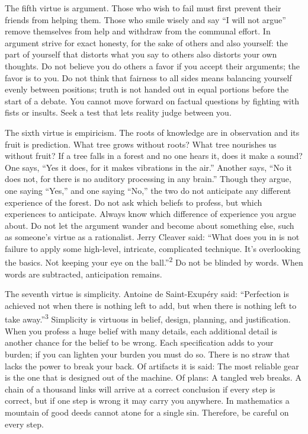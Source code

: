 {
 The fifth virtue is argument. Those who wish to fail must first
prevent their friends from helping them. Those who smile wisely and say
``I will not argue'' remove
themselves from help and withdraw from the communal effort. In argument
strive for exact honesty, for the sake of others and also yourself: the
part of yourself that distorts what you say to others also distorts
your own thoughts. Do not believe you do others a favor if you accept
their arguments; the favor is to you. Do not think that fairness to all
sides means balancing yourself evenly between positions; truth is not
handed out in equal portions before the start of a debate. You cannot
move forward on factual questions by fighting with fists or insults.
Seek a test that lets reality judge between you.}

{
 The sixth virtue is empiricism. The roots of knowledge are in
observation and its fruit is prediction. What tree grows without roots?
What tree nourishes us without fruit? If a tree falls in a forest and
no one hears it, does it make a sound? One says, ``Yes
it does, for it makes vibrations in the air.''
Another says, ``No it does not, for there is no
auditory processing in any brain.'' Though they
argue, one saying ``Yes,'' and one
saying ``No,'' the two do not
anticipate any different experience of the forest. Do not ask which
beliefs to profess, but which experiences to anticipate. Always know
which difference of experience you argue about. Do not let the argument
wander and become about something else, such as
someone's virtue as a rationalist. Jerry Cleaver said:
``What does you in is not failure to apply some
high-level, intricate, complicated technique. It's
overlooking the basics. Not keeping your eye on the
ball.''\textsuperscript{2} Do not be blinded by
words. When words are subtracted, anticipation remains.}

{
 The seventh virtue is simplicity. Antoine de Saint-Exupéry said:
``Perfection is achieved not when there is nothing
left to add, but when there is nothing left to take
away.''\textsuperscript{3} Simplicity is virtuous in
belief, design, planning, and justification. When you profess a huge
belief with many details, each additional detail is another chance for
the belief to be wrong. Each specification adds to your burden; if you
can lighten your burden you must do so. There is no straw that lacks
the power to break your back. Of artifacts it is said: The most
reliable gear is the one that is designed out of the machine. Of plans:
A tangled web breaks. A chain of a thousand links will arrive at a
correct conclusion if every step is correct, but if one step is wrong
it may carry you anywhere. In mathematics a mountain of good deeds
cannot atone for a single sin. Therefore, be careful on every step.}

